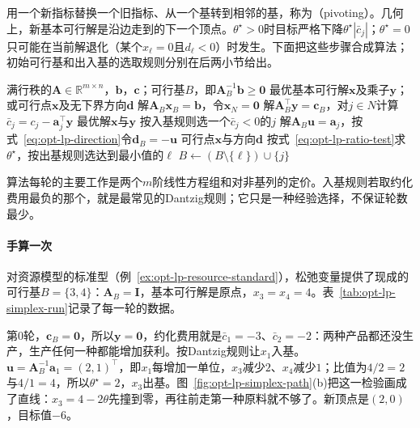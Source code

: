 用一个新指标替换一个旧指标、从一个基转到相邻的基，称为（pivoting）。几何上，新基本可行解是沿边走到的下一个顶点。$\theta^\star>0$时目标严格下降$\theta^\star|\bar c_j|$；$\theta^\star=0$只可能在当前解退化（某个$x_\ell=0$且$d_\ell<0$）时发生。下面把这些步骤合成算法；初始可行基和出入基的选取规则分别在后两小节给出。

\begin{algorithm}
\label{alg:opt-lp-simplex}
\begin{algorithmic}[1]
\Require 满行秩的$\bm A\in\mathbb R^{m\times n}$，$\bm b$，$\bm c$；可行基$B$，即$\bm A_B^{-1}\bm b\ge\bm 0$
\Ensure 最优基本可行解$\bm x$及乘子$\bm y$；或可行点$\bm x$及无下界方向$\bm d$
\Loop
  \State 解$\bm A_B\bm x_B=\bm b$，令$\bm x_N=\bm 0$
  \State 解$\bm A_B^\top\bm y=\bm c_B$，对$j\in N$计算$\bar c_j=c_j-\bm a_j^\top\bm y$
    \State \Return 最优解$\bm x$与$\bm y$
  \EndIf
  \State 按入基规则选一个$\bar c_j<0$的$j$
  \State 解$\bm A_B\bm u=\bm a_j$，按式~\eqref{eq:opt-lp-direction}令$\bm d_B=-\bm u$
    \State \Return 可行点$\bm x$与方向$\bm d$ 
  \EndIf
  \State 按式~\eqref{eq:opt-lp-ratio-test}求$\theta^\star$，按出基规则选达到最小值的$\ell$
  \State $B\gets(B\setminus\{\ell\})\cup\{j\}$
\EndLoop
\end{algorithmic}
\end{algorithm}

算法每轮的主要工作是两个$m$阶线性方程组和对非基列的定价。入基规则若取约化费用最负的那个，就是最常见的Dantzig规则；它只是一种经验选择，不保证轮数最少。

\paragraph{手算一次}
对资源模型的标准型（例~\ref{ex:opt-lp-resource-standard}），松弛变量提供了现成的可行基$B=\{3,4\}$：$\bm A_B=\bm I$，基本可行解是原点，$x_3=x_4=4$。表~\ref{tab:opt-lp-simplex-run}记录了每一轮的数据。

第$0$轮，$\bm c_B=\bm 0$，所以$\bm y=\bm 0$，约化费用就是$\bar c_1=-3$、$\bar c_2=-2$：两种产品都还没生产，生产任何一种都能增加获利。按Dantzig规则让$x_1$入基。$\bm u=\bm A_B^{-1}\bm a_1=(2,1)^\top$，即$x_1$每增加一单位，$x_3$减少$2$、$x_4$减少$1$；比值为$4/2=2$与$4/1=4$，所以$\theta^\star=2$，$x_3$出基。图~\ref{fig:opt-lp-simplex-path}(b)把这一检验画成了直线：$x_3=4-2\theta$先撞到零，再往前走第一种原料就不够了。新顶点是$(2,0)$，目标值$-6$。

